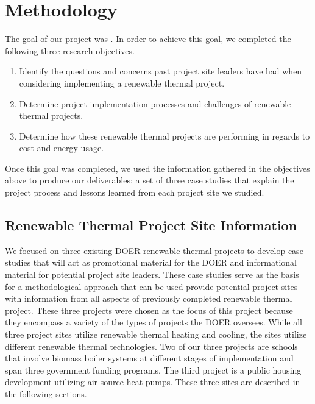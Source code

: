 
\chapter{Methodology}
\par The goal of our project was \goal. In order to achieve this goal, we completed the following three research objectives.
\begin{enumerate}
  \item{Identify the questions and concerns past project site leaders have had when considering implementing a renewable thermal project.}
  \item{Determine project implementation processes and challenges of renewable thermal projects.}
  \item{Determine how these renewable thermal projects are performing in regards to cost and energy usage.}
\end{enumerate}
\par Once this goal was completed, we used the information gathered in the objectives above to produce our deliverables: a set of three case studies that explain the project process and lessons learned from each project site we studied.

  \section{Renewable Thermal Project Site Information}
  \par We focused on three existing DOER renewable thermal projects to develop case studies that will act as promotional material for the DOER and informational material for potential project site leaders. These case studies serve as the basis for a methodological approach that can be used provide potential project sites with information from all aspects of previously completed renewable thermal project. These three projects were chosen as the focus of this project because they encompass a variety of the types of projects the DOER oversees. While all three project sites utilize renewable thermal heating and cooling, the sites utilize different renewable thermal technologies. Two of our three projects are schools that involve biomass boiler systems at different stages of implementation and span three government funding programs. The third project is a public housing development utilizing air source heat pumps. These three sites are described in the following sections.

